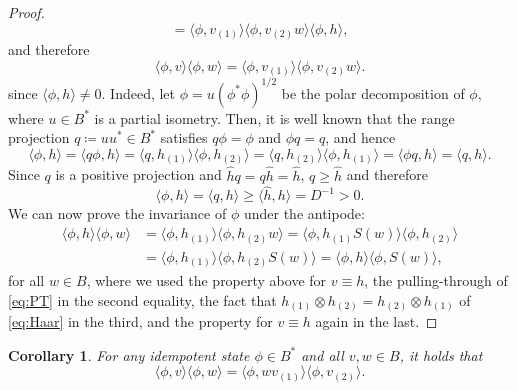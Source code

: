 \documentclass[a4paper,10pt]{amsart}
\newcommand{\eval}[2]{\langle #1 , #2\rangle}
\newtheorem{corollary}[theorem]{Corollary}
\theoremstyle{definition}
\begin{document}
\begin{proof}
\[		=
        \eval{\phi}{v_{(1)}} \eval{\phi}{v_{(2)}w} \eval{\phi}{h},
	\]
    and therefore
    \[
		\eval{\phi}{v}\eval{\phi}{w} 
		=
        \eval{\phi}{v_{(1)}} \eval{\phi}{v_{(2)}w}.
	\]
    since $\eval{\phi}{h} \neq 0$. 
    Indeed, let $\phi = u (\phi^* \phi)^{1/2}$ be the polar decomposition of $\phi$, where $u\in B^*$ is a partial isometry. Then, it is well known that the range projection $q \coloneqq u u^*\in B^*$ satisfies
    $q \phi =\phi$ and $ \phi q = q$, and hence
    \[
    \eval{\phi}{h}=\eval{q \phi }{h}=\eval{q}{h_{(1)}} \eval{\phi}{h_{(2)}} = \eval{q}{h_{(2)}} \eval{\phi}{h_{(1)}}=\eval{\phi q }{h} = \eval{q}{h}.
    \]
    Since $q$ is a positive projection and $\hat{h}q=q\hat{h}=\hat{h}$, $q\geq \hat{h}$ and therefore
    \[
        \eval{\phi}{h}=\eval{q}{h}\geq \eval{\hat{h}}{h} = D^{-1}>0.
    \]
	We can now prove the invariance of $\phi$ under the antipode:
	\begin{align*}
		\eval{\phi}{h}\eval{\phi}{w} 
        & =
        \eval{\phi}{h_{(1)}} \eval{\phi}{h_{(2)}w}
        =
        \eval{\phi}{h_{(1)}S(w)} \eval{\phi}{h_{(2)}}
		\\
        & =
        \eval{\phi}{h_{(1)}} \eval{\phi}{h_{(2)}S(w)}
        =
        \eval{\phi}{h} \eval{\phi}{S(w)},
	\end{align*}
	for all $w\in B$, where we used the property above for $v\equiv h$, the pulling-through of \cref{eq:PT} in the second equality, the fact that $h_{(1)} \otimes h_{(2)}= h_{(2)}\otimes h_{(1)}$ of \cref{eq:Haar} in the third, and the property for $v\equiv h$ again in the last.
\end{proof}

\begin{corollary}\label{cor:IdempPropExch}
    For any idempotent state $\phi\in B^*$ and all $v,w\in B$, it holds that
    \begin{equation*}
        \eval{\phi}{v}
            \eval{\phi}{w}
        =
        \eval{\phi}{w v_{(1)}}
            \eval{\phi}{v_{(2)}}.
    \end{equation*}
\end{corollary}
\end{document}
